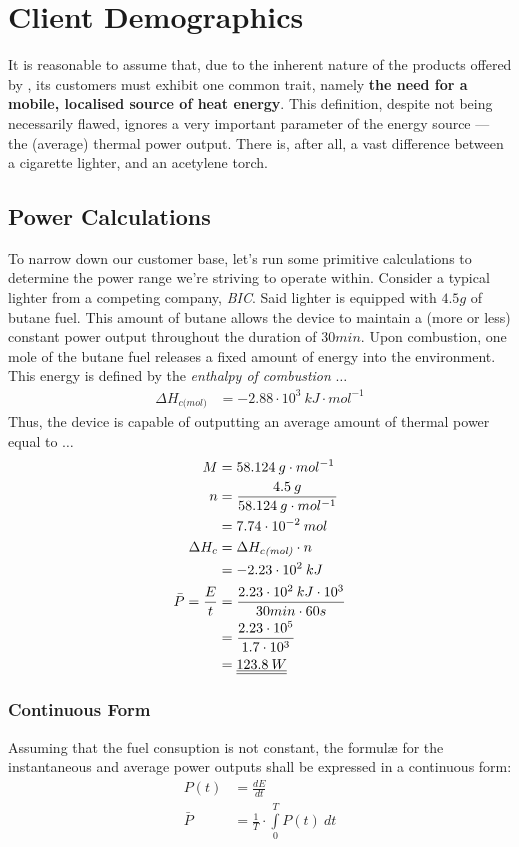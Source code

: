 \section{Client Demographics}
It is reasonable to assume that, due to the inherent nature of the products offered by \fw, its customers must
exhibit one common trait, namely \textbf{the need for a mobile, localised source of heat energy}.
This definition, despite not being necessarily flawed, ignores a very important parameter of the
energy source --- the (average) thermal power output.
There is, after all, a vast difference between a cigarette lighter, and an acetylene torch.
\subsection{Power Calculations}
To narrow down our customer base, let's run some primitive calculations to determine the power range we're striving to
operate within.
Consider a typical lighter from a competing company, \textit{BIC}. Said lighter is equipped with $4.5g$ of butane fuel.
This amount of butane allows the device to maintain a (more or less) constant power output throughout the duration of $30min$.
Upon combustion, one mole of the butane fuel releases a fixed amount of energy into the environment. This energy is defined
by the \textit{enthalpy of combustion} $\dots$
\begin{align*}
	\Delta H_{c\textit{(mol)}} &= -2.88 \cdot 10^3 \: kJ \cdot mol^{-1}
\end{align*}
Thus, the device is capable of outputting an average amount of thermal power equal to $\dots$
\begin{align*}
	M &= 58.124 \: g \cdot mol^{-1} \\
	n &= \frac{4.5 \: g}{58.124 \: g \cdot mol^{-1}} \\
	  &= 7.74 \cdot 10^{-2} \: mol \\
	\Delta H_c &= \Delta H_{c\textit{(mol)}} \cdot n \\
		   &= -2.23 \cdot 10^2 \: kJ \\
	\bar{P} = \frac{E}{t} &= \frac{2.23 \cdot 10^2 \: kJ \cdot 10^3}{30min \cdot 60s} \\
			&= \frac{2.23 \cdot 10^5}{1.7 \cdot 10^3} \\
			&= \underline{\underline{123.8 \: W}}
\end{align*}
\subsubsection{Continuous Form}
Assuming that the fuel consuption is not constant, the formul{\ae} for the instantaneous and average power outputs
shall be expressed in a continuous form:
\begin{align*}
	P(t) &= \frac{dE}{dt} \\
	\bar{P} &= \frac{1}{T} \cdot \int\limits_{0}^{T} P(t) \: dt
\end{align*}
